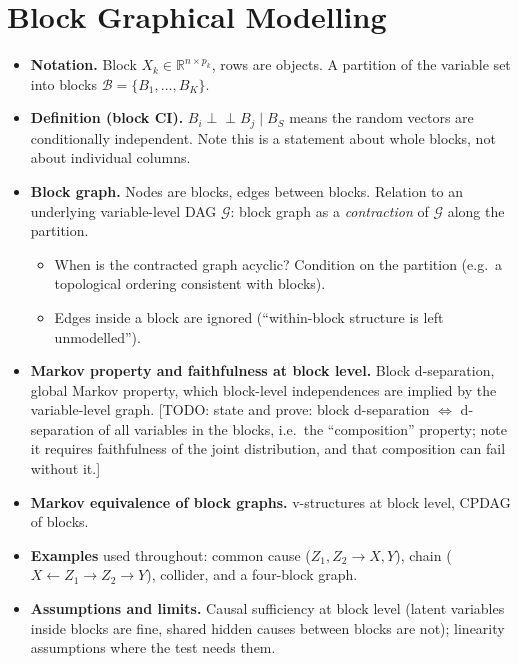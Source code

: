 \documentclass[10pt,leqno]{amsart}
\newcommand{\todo}[1]{{\color{red}[TODO: #1]}}
\newcommand{\ci}{\perp\!\!\!\perp}          %
\begin{document}
\section{Block Graphical Modelling}
\begin{itemize}
\item \textbf{Notation.} Block $X_k\in\mathbb{R}^{n\times p_k}$, rows are objects.
  A partition of the variable set into blocks $\mathcal{B}=\{B_1,\dots,B_K\}$.
\item \textbf{Definition (block CI).} $B_i \ci B_j \mid B_S$ means the random
  vectors are conditionally independent. Note this is a statement about whole
  blocks, not about individual columns.
\item \textbf{Block graph.} Nodes are blocks, edges between blocks. Relation to an
  underlying variable-level DAG $\mathcal{G}$: block graph as a \emph{contraction} of
  $\mathcal{G}$ along the partition.
  \begin{itemize}
  \item When is the contracted graph acyclic? Condition on the partition
    (e.g.\ a topological ordering consistent with blocks).
  \item Edges inside a block are ignored (``within-block structure is left
    unmodelled'').
  \end{itemize}
\item \textbf{Markov property and faithfulness at block level.} Block
  d-separation, global Markov property, which block-level independences are implied
  by the variable-level graph. \todo{state and prove: block d-separation $\Leftrightarrow$
  d-separation of all variables in the blocks, i.e.\ the ``composition'' property;
  note it requires faithfulness of the joint distribution, and that composition
  can fail without it.}
\item \textbf{Markov equivalence of block graphs.} v-structures at block level,
  CPDAG of blocks.
\item \textbf{Examples} used throughout: common cause ($Z_1,Z_2\to X,Y$), chain
  ($X\leftarrow Z_1\to Z_2\to Y$), collider, and a four-block graph.
\item \textbf{Assumptions and limits.} Causal sufficiency at block level (latent
  variables inside blocks are fine, shared hidden causes between blocks are not);
  linearity assumptions where the test needs them.
\end{itemize}

\end{document}
